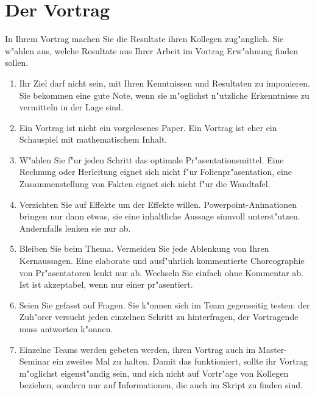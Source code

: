 \documentclass[a4paper]{article}
\begin{document}
\section{Der Vortrag}
In Ihrem Vortrag machen Sie die Resultate ihren Kollegen zug"anglich.
Sie w"ahlen aus, welche Resultate aus Ihrer Arbeit im Vortrag 
Erw"ahnung finden sollen.

\begin{enumerate}
\item
Ihr Ziel darf nicht sein, mit Ihren Kenntnissen und Resultaten
zu imponieren. 
Sie bekommen eine gute Note, wenn sie m"oglichst n"utzliche 
Erkenntnisse zu vermitteln in der Lage sind.
\item
Ein Vortrag ist nicht ein vorgelesenes Paper.
Ein Vortrag ist eher ein Schauspiel mit mathematischem Inhalt.
\item
W"ahlen Sie f"ur jeden Schritt das optimale Pr"asentationsmittel.
Eine Rechnung oder Herleitung eignet sich nicht f"ur Folienpr"asentation,
eine Zusammenstellung von Fakten eignet sich nicht f"ur die Wandtafel.
\item
Verzichten Sie auf Effekte um der Effekte willen.
Powerpoint-Animationen bringen nur dann etwas, sie eine inhaltliche
Aussage sinnvoll unterst"utzen.
Andernfalls lenken sie nur ab.
\item
Bleiben Sie beim Thema.
Vermeiden Sie jede Ablenkung von Ihren Kernaussagen.
Eine elaborate und ausf"uhrlich kommentierte Choreographie von
Pr"asentatoren lenkt nur ab.
Wechseln Sie einfach ohne Kommentar ab.
Ist ist akzeptabel, wenn nur einer pr"asentiert.
\item
Seien Sie gefasst auf Fragen. 
Sie k"onnen sich im Team gegenseitig testen: der Zuh"orer versucht
jeden einzelnen Schritt zu hinterfragen, der Vortragende muss
antworten k"onnen.
\item
Einzelne Teams werden gebeten werden, ihren Vortrag auch im
Master-Seminar ein zweites Mal zu halten.
Damit das funktioniert, sollte ihr Vortrag m"oglichst eigenst"andig sein,
und sich nicht auf Vortr"age von Kollegen beziehen, sondern nur auf
Informationen, die auch im Skript zu finden sind.
\end{enumerate}
\end{document}

